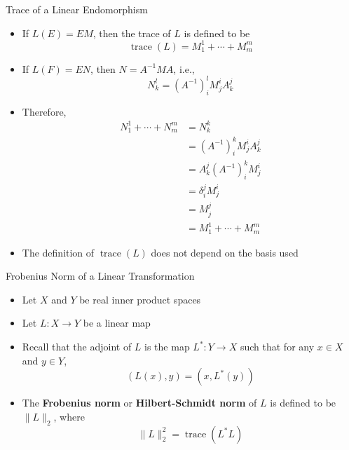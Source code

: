 \documentclass[usenames,dvipsnames,10pt]{beamer}
\newcommand\trace{\operatorname{trace}}
\begin{document}
\begin{frame}
  {Trace of a Linear Endomorphism}

  \begin{itemize}
  \item If $L(E) = EM$, then the trace of $L$ is defined to be
    \[
      \trace(L) = M^1_1 + \cdots + M^m_m
    \]
  \item If $L(F) = EN$, then $N = A^{-1}MA$, i.e.,
    \[
      N^l_k = (A^{-1})^l_iM^i_jA^j_k
    \]
  \item Therefore,
    \begin{align*}
      N_1^1 + \cdots + N^m_m &= N^k_k\\
                             &= (A^{-1})^k_iM^i_jA^j_k\\
                             &= A^j_k(A^{-1})^k_iM^i_j\\
                             &= \delta^j_iM^i_j\\
                             &= M^j_j\\
                             &= M^1_1 + \cdots + M^m_m
    \end{align*}
  \item The definition of $\trace(L)$ does not depend on the basis used
  \end{itemize}
\end{frame}

\begin{frame}
  {Frobenius Norm of a Linear Transformation}

  \begin{itemize}
  \item Let $X$ and $Y$ be real inner product spaces
  \item Let $L: X \rightarrow Y$ be a linear map
  \item Recall that the adjoint of $L$ is the map $L^*: Y \rightarrow X$ such that for any $x \in X$ and $y \in Y$,
    \[
      (L(x),y) = (x,L^*(y))
    \]
  \item The {\bf Frobenius norm} or {\bf Hilbert-Schmidt norm} of $L$ is defined to be $\|L\|_2$, where
    \[ \|L\|_2^2 = \trace(L^*L) \]
  \end{itemize}
\end{frame}
\end{document}
